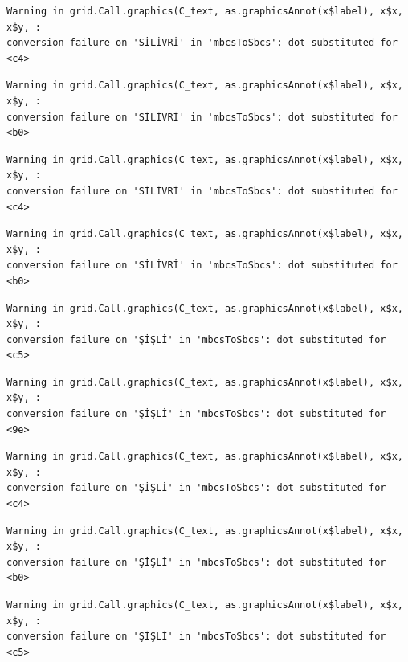 \documentclass[
  11pt,
  a4paper,
  DIV=11,
  numbers=noendperiod]{scrartcl}
\begin{document}
\begin{verbatim}
Warning in grid.Call.graphics(C_text, as.graphicsAnnot(x$label), x$x, x$y, :
conversion failure on 'SİLİVRİ' in 'mbcsToSbcs': dot substituted for <c4>
\end{verbatim}

\begin{verbatim}
Warning in grid.Call.graphics(C_text, as.graphicsAnnot(x$label), x$x, x$y, :
conversion failure on 'SİLİVRİ' in 'mbcsToSbcs': dot substituted for <b0>
\end{verbatim}

\begin{verbatim}
Warning in grid.Call.graphics(C_text, as.graphicsAnnot(x$label), x$x, x$y, :
conversion failure on 'SİLİVRİ' in 'mbcsToSbcs': dot substituted for <c4>
\end{verbatim}

\begin{verbatim}
Warning in grid.Call.graphics(C_text, as.graphicsAnnot(x$label), x$x, x$y, :
conversion failure on 'SİLİVRİ' in 'mbcsToSbcs': dot substituted for <b0>
\end{verbatim}

\begin{verbatim}
Warning in grid.Call.graphics(C_text, as.graphicsAnnot(x$label), x$x, x$y, :
conversion failure on 'ŞİŞLİ' in 'mbcsToSbcs': dot substituted for <c5>
\end{verbatim}

\begin{verbatim}
Warning in grid.Call.graphics(C_text, as.graphicsAnnot(x$label), x$x, x$y, :
conversion failure on 'ŞİŞLİ' in 'mbcsToSbcs': dot substituted for <9e>
\end{verbatim}

\begin{verbatim}
Warning in grid.Call.graphics(C_text, as.graphicsAnnot(x$label), x$x, x$y, :
conversion failure on 'ŞİŞLİ' in 'mbcsToSbcs': dot substituted for <c4>
\end{verbatim}

\begin{verbatim}
Warning in grid.Call.graphics(C_text, as.graphicsAnnot(x$label), x$x, x$y, :
conversion failure on 'ŞİŞLİ' in 'mbcsToSbcs': dot substituted for <b0>
\end{verbatim}

\begin{verbatim}
Warning in grid.Call.graphics(C_text, as.graphicsAnnot(x$label), x$x, x$y, :
conversion failure on 'ŞİŞLİ' in 'mbcsToSbcs': dot substituted for <c5>
\end{verbatim}
\end{document}
